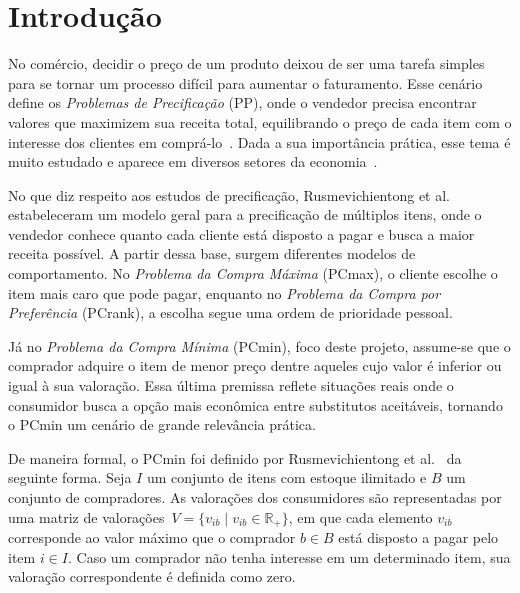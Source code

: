 \section{Introdução}

No comércio, decidir o preço de um produto deixou de ser uma tarefa simples para se tornar um processo difícil para aumentar o faturamento. Esse cenário define os \emph{Problemas de Precificação} (PP), onde o vendedor precisa encontrar valores que maximizem sua receita total, equilibrando o preço de cada item com o interesse dos clientes em comprá-lo~\cite{smith1986}. Dada a sua importância prática, esse tema é muito estudado e aparece em diversos setores da economia~\cite{aggarwal2004,venkatesan2005,shmuel1984,shmuel1987,smith1986}.

No que diz respeito aos estudos de precificação, Rusmevichientong et al.~\cite{rusmevichientong2006} estabeleceram um modelo geral para a precificação de múltiplos itens, onde o vendedor conhece quanto cada cliente está disposto a pagar e busca a maior receita possível. A partir dessa base, surgem diferentes modelos de comportamento. No \textit{Problema da Compra Máxima} (PCmax), o cliente escolhe o item mais caro que pode pagar, enquanto no \textit{Problema da Compra por Preferência} (PCrank), a escolha segue uma ordem de prioridade pessoal.


Já no \emph{Problema da Compra Mínima} (PCmin), foco deste projeto, assume-se que o comprador adquire o item de menor preço dentre aqueles cujo valor é inferior ou igual à sua valoração. Essa última premissa reflete situações reais onde o consumidor busca a opção mais econômica entre substitutos aceitáveis, tornando o PCmin um cenário de grande relevância prática.

De maneira formal, o PCmin foi definido por Rusmevichientong et al.~\cite{rusmevichientong2006} da seguinte forma. Seja $I$ um conjunto de itens com estoque ilimitado e $B$ um conjunto de compradores. As valorações dos consumidores são representadas por uma matriz de valorações~$V = \{v_{ib} \mid v_{ib} \in \mathbb{R}_+\}$, em que cada elemento $v_{ib}$ corresponde ao valor máximo que o comprador $b \in B$ está disposto a pagar pelo item $i \in I$. Caso um comprador não tenha interesse em um determinado item, sua valoração correspondente é definida como zero.

